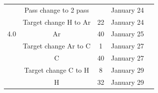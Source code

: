 \documentclass[12pt]{article}
\begin{document}
\begin{table}
\begin{tabular}{@{}ccccc@{}}
    & Pass change to 2 pass  &    &  January 24\\     
       & Target change H to Ar & 22 & January 24
       \\   4.0 & Ar     & 40    & January 25 \\ 
       & Target change Ar to C & 1 & January 27\\   
     &  C    & 40  & January 27  \\
      & Target change C to H & 8 & January 29\\   
      &  H   & 32  &  January 29\\


\bottomrule
    \end{tabular}
\end{table}
\end{document}

